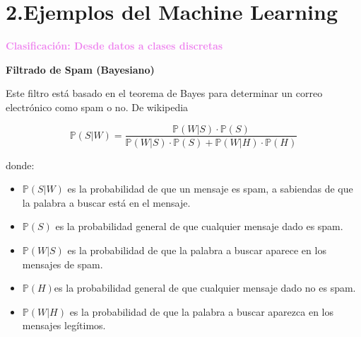 \documentclass[11pt]{beamer}
\begin{document}
\section{2.Ejemplos del Machine Learning }

 \begin{frame}{\textbf{\textcolor{violet}{Clasificaci\'on: Desde datos a clases discretas}} }
 	


\vspace{0.2cm}

\textbf{Filtrado de Spam (Bayesiano)}

\scriptsize{Este filtro est\'a basado en el teorema de Bayes para determinar un correo electr\'onico como spam o no. De wikipedia
	
	
\[
\mathbb{P}(S|W) = \frac{\mathbb{P}(W|S)\cdot\mathbb{P}(S)}{\mathbb{P}(W|S)\cdot \mathbb{P}(S) + \mathbb{P}(W|H)\cdot \mathbb{P}(H) }
\]

donde:


\begin{itemize}
\item $\mathbb{P}(S|W)$ es la probabilidad de que un mensaje es spam, a sabiendas de que la palabra a buscar est\'a en el mensaje.
\item $\mathbb{P}(S)$ es la probabilidad general de que cualquier mensaje dado es spam.
\item $\mathbb{P}(W|S)$ es la probabilidad de que la palabra a buscar aparece en los mensajes de spam.
\item $\mathbb{P}(H)$es la probabilidad general de que cualquier mensaje dado no es spam.
\item  $\mathbb{P}(W|H)$ es la probabilidad de que la palabra a buscar  aparezca en los mensajes leg\'itimos.
\end{itemize}
}


\end{frame}
\end{document}
